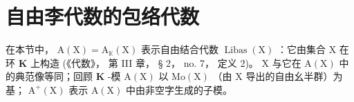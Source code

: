 \section{自由李代数的包络代数}

在本节中， \(\mathrm{A}(\mathrm{X}) = \mathrm{A}_{\mathbb{K}}(\mathrm{X})\) 表示自由结合代数 \(\operatorname{Libas}(\mathrm{X})\) ：它由集合 \(\mathrm{X}\) 在环 \(\mathbf{K}\) 上构造 (《代数》， 第 III 章， § 2， no. 7， 定义 2)。 \(\mathrm{X}\) 与它在 \(\mathrm{A}(\mathrm{X})\) 中的典范像等同；回顾 \(\mathbf{K}\) -模 \(\mathrm{A}(\mathrm{X})\) 以 \(\mathrm{Mo}(\mathrm{X})\) （由 \(\mathrm{X}\) 导出的自由幺半群）为基； \(\mathrm{A}^{+}(\mathrm{X})\) 表示 \(\mathrm{A}(\mathrm{X})\) 中由非空字生成的子模。

